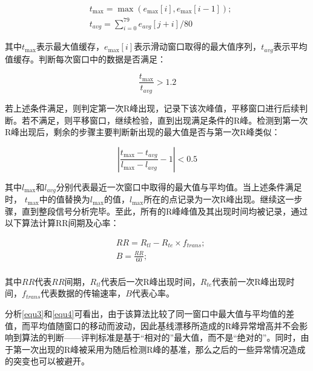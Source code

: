 \begin{equation}
\begin{aligned}
 & {{t}_{\max }}=\max ({{e}_{\max }}[i],{{e}_{\max }}[i-1]); \\ 
 & {{t}_{avg}}={\sum\limits_{i=0}^{79}{{{e}_{avg}}[j+i]}}/{80}\;  
\end{aligned}
\label{equ2}
\end{equation}

其中${{t}_{\max}}$表示最大值缓存，${{e}_{\max }}[i]$表示滑动窗口取得的最大值序列，${{t}_{avg}}$表示平均值缓存。判断每次窗口中的数据是否满足：

\begin{equation}
\frac{{{t}_{\max }}}{{{t}_{avg}}}>1.2
\label{equ3}
\end{equation}

若上述条件满足，则判定第一次R峰出现，记录下该次峰值，平移窗口进行后续判断。若不满足，则平移窗口，继续检验，直到出现满足条件的R峰。检测到第一次R峰出现后，剩余的步骤主要判断新出现的最大值是否与第一次R峰类似：

\begin{equation}
\left| \frac{{{t}_{\max }}-{{t}_{avg}}}{{{l}_{\max }}-{{l}_{avg}}}-1 \right|<0.5
\label{equ4}
\end{equation}

其中${{l}_{\max }}$和${{l}_{avg}}$分别代表最近一次窗口中取得的最大值与平均值。当上述条件满足时， ${{t}_{\max }}$中的值替换为${{l}_{\max }}$的值，${{l}_{\max }}$所在的点记录为一次R峰出现。继续这一步骤，直到整段信号分析完毕。至此，所有的R峰峰值及其出现时间均被记录，通过以下算法计算RR间期及心率：

\begin{equation}
\begin{aligned}
  & RR={{R}_{tl}}-{{R}_{te}}\times {{f}_{trans}}; \\ 
 & B=\frac{RR}{60}; \\ 
\end{aligned}
\label{equ5}
\end{equation}

其中$RR$代表$RR$间期，${{R}_{tl}}$代表后一次R峰出现时间，${{R}_{te}}$代表前一次R峰出现时间，${{f}_{trans}}$代表数据的传输速率，$B$代表心率。
	
分析\ref{equ3}和\ref{equ4}可看出，由于该算法比较了同一窗口中最大值与平均值的差值，而平均值随窗口的移动而波动，因此基线漂移所造成的R峰异常增高并不会影响到算法的判断——评判标准是基于“相对的”最大值，而不是“绝对的”。同时，由于第一次出现的R峰被采用为随后检测R峰的基准，那么之后的一些异常情况造成的突变也可以被避开。

